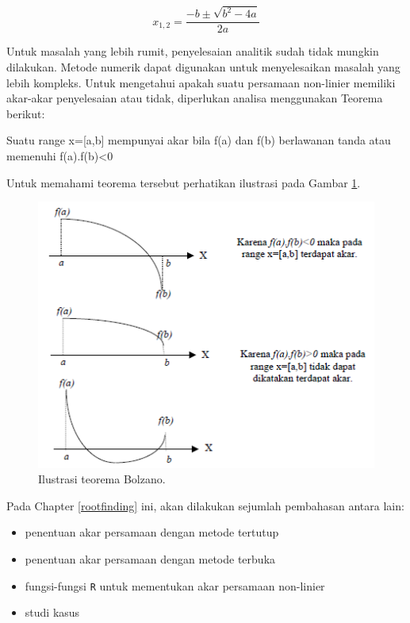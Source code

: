 \documentclass[]{book}
\providecommand{\tightlist}{%
  \setlength{\itemsep}{0pt}\setlength{\parskip}{0pt}}
\theoremstyle{definition}
\theoremstyle{definition}
\theoremstyle{definition}
\theoremstyle{remark}
\let\BeginKnitrBlock\begin \let\EndKnitrBlock\end
\begin{document}
\begin{equation}
x_{1,2}=\frac{-b\pm\sqrt{b^2-4a}}{2a}
  \label{eq:kuadratik}
\end{equation}

Untuk masalah yang lebih rumit, penyelesaian analitik sudah tidak mungkin dilakukan. Metode numerik dapat digunakan untuk menyelesaikan masalah yang lebih kompleks. Untuk mengetahui apakah suatu persamaan non-linier memiliki akar-akar penyelesaian atau tidak, diperlukan analisa menggunakan Teorema berikut:

\BeginKnitrBlock{theorem}[root]
\protect\hypertarget{thm:unnamed-chunk-205}{}{\label{thm:unnamed-chunk-205} {} }Suatu range x={[}a,b{]} mempunyai akar bila f(a) dan f(b) berlawanan tanda atau memenuhi f(a).f(b)\textless{}0
\EndKnitrBlock{theorem}

Untuk memahami teorema tersebut perhatikan ilustrasi pada Gambar \ref{fig:Bolzano}.

\begin{figure}

{\centering \includegraphics[width=0.8\linewidth]{./images/Bolzano} 

}

\caption{Ilustrasi teorema Bolzano.}\label{fig:Bolzano}
\end{figure}

Pada Chapter \ref{rootfinding} ini, akan dilakukan sejumlah pembahasan antara lain:

\begin{itemize}
\tightlist
\item
  penentuan akar persamaan dengan metode tertutup
\item
  penentuan akar persamaan dengan metode terbuka
\item
  fungsi-fungsi \texttt{R} untuk mementukan akar persamaan non-linier
\item
  studi kasus
\end{itemize}
\end{document}
